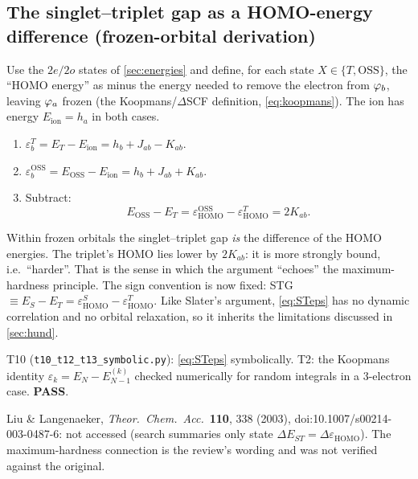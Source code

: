 \subsection{The singlet--triplet gap as a HOMO-energy difference (frozen-orbital derivation)}
Use the $2e/2o$ states of \cref{sec:energies} and define, for each state $X\in\{T,\text{OSS}\}$, the ``HOMO
energy'' as minus the energy needed to remove the electron from $\varphi_b$, leaving $\varphi_a$ frozen (the
Koopmans/$\Delta$SCF definition, \cref{eq:koopmans}). The ion has energy $E_{\text{ion}}=h_a$ in both cases.
\begin{enumerate}
  \item $\varepsilon_b^{T}=E_T-E_{\text{ion}}=h_b+J_{ab}-K_{ab}$.
  \item $\varepsilon_b^{\text{OSS}}=E_{\text{OSS}}-E_{\text{ion}}=h_b+J_{ab}+K_{ab}$.
  \item Subtract:
        \begin{equation}\label{eq:STeps}
          \boxed{E_{\text{OSS}}-E_T=\varepsilon_{\text{HOMO}}^{\text{OSS}}-\varepsilon_{\text{HOMO}}^{T}=2K_{ab}.}
        \end{equation}
\end{enumerate}
\begin{resultbox}
Within frozen orbitals the singlet--triplet gap \emph{is} the difference of the HOMO energies. The
triplet's HOMO lies lower by $2K_{ab}$: it is more strongly bound, i.e.\ ``harder''. That is the sense in
which the argument ``echoes'' the maximum-hardness principle. The sign convention is now fixed:
STG $\equiv E_S-E_T=\varepsilon^{S}_{\text{HOMO}}-\varepsilon^{T}_{\text{HOMO}}$.
Like Slater's argument, \cref{eq:STeps} has no dynamic correlation and no orbital relaxation, so it
inherits the limitations discussed in \cref{sec:hund}.
\end{resultbox}
\begin{verifybox}
T10 (\texttt{t10\_t12\_t13\_symbolic.py}): \cref{eq:STeps} symbolically. T2: the Koopmans identity
$\varepsilon_k=E_N-E_{N-1}^{(k)}$ checked numerically for random integrals in a 3-electron case. \textbf{PASS}.
\end{verifybox}
\begin{sourcebox}
Liu \& Langenaeker, \emph{Theor.\ Chem.\ Acc.}\ \textbf{110}, 338 (2003), doi:10.1007/s00214-003-0487-6: not accessed
(search summaries only state $\Delta E_{ST}=\Delta\varepsilon_{\text{HOMO}}$). The maximum-hardness connection is the
review's wording and was not verified against the original.
\end{sourcebox}
